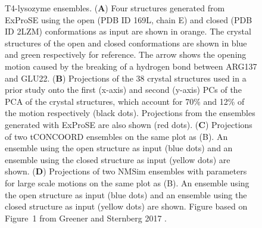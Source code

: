 \begin{figure}
\centering


\caption{T4-lysozyme ensembles.
(\textbf{A}) Four structures generated from ExProSE using the open (PDB ID 169L, chain E)  and closed (PDB ID 2LZM) conformations as input are shown in orange.
The crystal structures of the open and closed conformations are shown in blue and green respectively for reference.
The arrow shows the opening motion caused by the breaking of a hydrogen bond between ARG137 and GLU22.
(\textbf{B}) Projections of the 38 crystal structures used in a prior study \cite{DeGroot1998} onto the first (x-axis) and second (y-axis) PCs of the PCA of the crystal structures, which account for 70\% and 12\% of the motion respectively (black dots).
Projections from the ensembles generated with ExProSE are also shown (red dots).
(\textbf{C}) Projections of two tCONCOORD ensembles on the same plot as (B).
An ensemble using the open structure as input (blue dots) and an ensemble using the closed structure as input (yellow dots) are shown.
(\textbf{D}) Projections of two NMSim ensembles with parameters for large scale motions on the same plot as (B).
An ensemble using the open structure as input (blue dots) and an ensemble using the closed structure as input (yellow dots) are shown.
Figure based on Figure~1 from Greener and Sternberg 2017 \cite{Greener2017}.}

\label{fig:t4l}
\end{figure}


